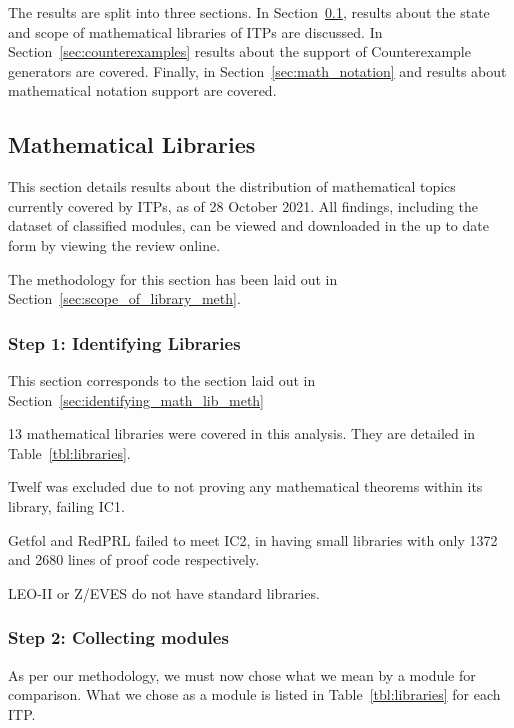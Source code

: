\documentclass[
]{article}
\begin{document}
The results are split into three sections. In
Section~\ref{sec:math_libraries}, results about the state and scope of
mathematical libraries of ITPs are discussed. In
Section~\ref{sec:counterexamples} results about the support of
Counterexample generators are covered. Finally, in
Section~\ref{sec:math_notation} and results about mathematical notation
support are covered.

\hypertarget{sec:math_libraries}{%
\subsection{Mathematical Libraries}\label{sec:math_libraries}}

This section details results about the distribution of mathematical
topics currently covered by ITPs, as of 28 October 2021. All findings,
including the dataset of classified modules, can be viewed and
downloaded in the up to date form by viewing the review online.

The methodology for this section has been laid out in
Section~\ref{sec:scope_of_library_meth}.

\hypertarget{step-1-identifying-libraries}{%
\subsubsection{Step 1: Identifying
Libraries}\label{step-1-identifying-libraries}}

This section corresponds to the section laid out in
Section~\ref{sec:identifying_math_lib_meth}

13 mathematical libraries were covered in this analysis. They are
detailed in Table~\ref{tbl:libraries}.

Twelf was excluded due to not proving any mathematical theorems within
its library, failing IC1.

Getfol and RedPRL failed to meet IC2, in having small libraries with
only 1372 and 2680 lines of proof code respectively.

LEO-II or Z/EVES do not have standard libraries.

\hypertarget{step-2-collecting-modules}{%
\subsubsection{Step 2: Collecting
modules}\label{step-2-collecting-modules}}

As per our methodology, we must now chose what we mean by a module for
comparison. What we chose as a module is listed in
Table~\ref{tbl:libraries} for each ITP.
\end{document}
